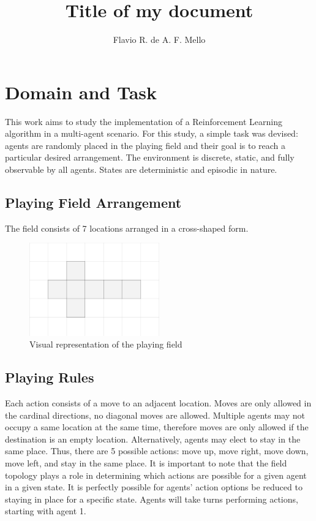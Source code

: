 \documentclass[11pt]{article}
\title{Title of my document}
\author{Flavio R. de A. F. Mello}
\begin{document}
\maketitle

\section{Domain and Task}
    This work aims to study the implementation of a Reinforcement Learning algorithm in a multi-agent scenario. For this study, a simple task was devised: agents are randomly placed in the playing field and their goal is to reach a particular desired arrangement. The environment is discrete, static, and fully observable by all agents. States are deterministic and episodic in nature.

\subsection{Playing Field Arrangement}
    The field consists of 7 locations arranged in a cross-shaped form.

    \begin{figure}[h]
        \centering
        \includegraphics[height=4cm]{./Images/1_Playing_Field.jpg}
        \caption{Visual representation of the playing field}
    \end{figure}

\subsection{Playing Rules}
    Each action consists of a move to an adjacent location. Moves are only allowed in the cardinal directions, no diagonal moves are allowed. Multiple agents may not occupy a same location at the same time, therefore moves are only allowed if the destination is an empty location. Alternatively, agents may elect to stay in the same place. Thus, there are 5 possible actions: move up, move right, move down, move left, and stay in the same place. It is important to note that the field topology plays a role in determining which actions are possible for a given agent in a given state. It is perfectly possible for agents' action options be reduced to staying in place for a specific state. Agents will take turns performing actions, starting with agent 1.
\end{document}
